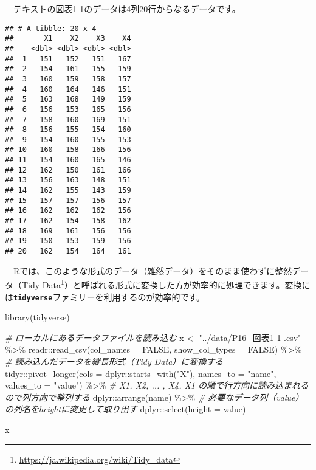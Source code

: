 \documentclass[
  12pt,
]{book}
\newenvironment{Shaded}{\begin{snugshade}}{\end{snugshade}}
\newcommand{\AttributeTok}[1]{\textcolor[rgb]{0.77,0.63,0.00}{#1}}
\newcommand{\CommentTok}[1]{\textcolor[rgb]{0.56,0.35,0.01}{\textit{#1}}}
\newcommand{\ConstantTok}[1]{\textcolor[rgb]{0.00,0.00,0.00}{#1}}
\newcommand{\FunctionTok}[1]{\textcolor[rgb]{0.00,0.00,0.00}{#1}}
\newcommand{\NormalTok}[1]{#1}
\newcommand{\OtherTok}[1]{\textcolor[rgb]{0.56,0.35,0.01}{#1}}
\newcommand{\SpecialCharTok}[1]{\textcolor[rgb]{0.00,0.00,0.00}{#1}}
\newcommand{\StringTok}[1]{\textcolor[rgb]{0.31,0.60,0.02}{#1}}
\DeclareRobustCommand{\href}[2]{#2\footnote{\url{#1}}}
\begin{document}
　テキストの図表1-1のデータは4列20行からなるデータです。

\begin{verbatim}
## # A tibble: 20 x 4
##       X1    X2    X3    X4
##    <dbl> <dbl> <dbl> <dbl>
##  1   151   152   151   167
##  2   154   161   155   159
##  3   160   159   158   157
##  4   160   164   146   151
##  5   163   168   149   159
##  6   156   153   165   156
##  7   158   160   169   151
##  8   156   155   154   160
##  9   154   160   155   153
## 10   160   158   166   156
## 11   154   160   165   146
## 12   162   150   161   166
## 13   156   163   148   151
## 14   162   155   143   159
## 15   157   157   156   157
## 16   162   162   162   156
## 17   162   154   158   162
## 18   169   161   156   156
## 19   150   153   159   156
## 20   162   154   164   161
\end{verbatim}

　Rでは、このような形式のデータ（雑然データ）をそのまま使わずに整然データ（\href{https://ja.wikipedia.org/wiki/Tidy_data}{Tidy Data}）と呼ばれる形式に変換した方が効率的に処理できます。変換には\textbf{\texttt{tidyverse}}ファミリーを利用するのが効率的です。

\begin{Shaded}
\begin{Highlighting}[]
\FunctionTok{library}\NormalTok{(tidyverse)}

\CommentTok{\# ローカルにあるデータファイルを読み込む}
\NormalTok{x }\OtherTok{\textless{}{-}} \StringTok{"../data/P16\_図表1{-}1 .csv"} \SpecialCharTok{\%\textgreater{}\%} 
\NormalTok{  readr}\SpecialCharTok{::}\FunctionTok{read\_csv}\NormalTok{(}\AttributeTok{col\_names =} \ConstantTok{FALSE}\NormalTok{, }\AttributeTok{show\_col\_types =} \ConstantTok{FALSE}\NormalTok{) }\SpecialCharTok{\%\textgreater{}\%} 
  \CommentTok{\# 読み込んだデータを縦長形式（Tidy Data）に変換する}
\NormalTok{  tidyr}\SpecialCharTok{::}\FunctionTok{pivot\_longer}\NormalTok{(}\AttributeTok{cols =}\NormalTok{ dplyr}\SpecialCharTok{::}\FunctionTok{starts\_with}\NormalTok{(}\StringTok{"X"}\NormalTok{),}
                      \AttributeTok{names\_to =} \StringTok{"name"}\NormalTok{, }\AttributeTok{values\_to =} \StringTok{"value"}\NormalTok{) }\SpecialCharTok{\%\textgreater{}\%} 
  \CommentTok{\# X1, X2, ... , X4, X1 の順で行方向に読み込まれるので列方向で整列する}
\NormalTok{  dplyr}\SpecialCharTok{::}\FunctionTok{arrange}\NormalTok{(name) }\SpecialCharTok{\%\textgreater{}\%} 
  \CommentTok{\# 必要なデータ列（value）の列名をheightに変更して取り出す}
\NormalTok{  dplyr}\SpecialCharTok{::}\FunctionTok{select}\NormalTok{(}\AttributeTok{height =}\NormalTok{ value)}

\NormalTok{x}
\end{Highlighting}
\end{Shaded}
\end{document}

